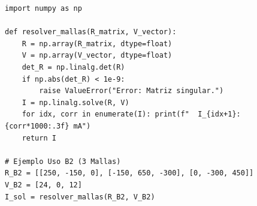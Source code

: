 \documentclass[11pt, a4paper]{article}
\begin{document}
\vspace{0.4cm}
\begin{lstlisting}[caption={Script de Verificación Rápida para los Estudiantes}]
import numpy as np

def resolver_mallas(R_matrix, V_vector):
    R = np.array(R_matrix, dtype=float)
    V = np.array(V_vector, dtype=float)
    det_R = np.linalg.det(R)
    if np.abs(det_R) < 1e-9:
        raise ValueError("Error: Matriz singular.")
    I = np.linalg.solve(R, V)
    for idx, corr in enumerate(I): print(f"  I_{idx+1}: {corr*1000:.3f} mA")
    return I

# Ejemplo Uso B2 (3 Mallas)
R_B2 = [[250, -150, 0], [-150, 650, -300], [0, -300, 450]]
V_B2 = [24, 0, 12]
I_sol = resolver_mallas(R_B2, V_B2)
\end{lstlisting}
\end{document}
